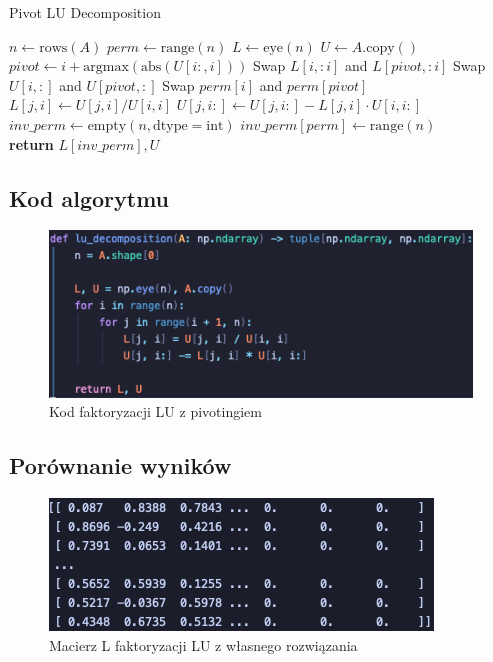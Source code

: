 \documentclass{article}
\begin{document}
\begin{algorithm}
\caption{Pivot LU Decomposition}
\begin{algorithmic}[1]
    \State $n \gets \text{rows}(A)$
    \State $perm \gets \text{range}(n)$
    \State $L \gets \text{eye}(n)$
    \State $U \gets A.\text{copy}()$
    \\
        \State $pivot \gets i + \text{argmax}(\text{abs}(U[i:, i]))$
        \State Swap $L[i, :i]$ and $L[pivot, :i]$
        \State Swap $U[i, :]$ and $U[pivot, :]$
        \State Swap $perm[i]$ and $perm[pivot]$
        \\
            \State $L[j, i] \gets U[j, i] / U[i, i]$
            \State $U[j, i:] \gets U[j, i:] - L[j, i] \cdot U[i, i:]$
        \EndFor
    \EndFor
    \\
    \State $inv\_perm \gets \text{empty}(n, \text{dtype}=\text{int})$
    \State $inv\_perm[perm] \gets \text{range}(n)$
    \\
    \State \textbf{return} $L[inv\_perm], U$
\EndProcedure
\end{algorithmic}
\end{algorithm}

\subsection{Kod algorytmu}

\begin{figure}[htbp]
  \centering
  \includegraphics[width=0.9\linewidth]{lu.png}
  \caption{Kod faktoryzacji LU z pivotingiem}
  \label{fig:pivot_lu}
\end{figure}

\subsection{Porównanie wyników}

\begin{figure}[htbp]
  \centering
  \includegraphics[width=\linewidth]{l_python2.png}
  \caption{Macierz L faktoryzacji LU z własnego rozwiązania}
  \label{fig:l_python2}
\end{figure}
\end{document}
